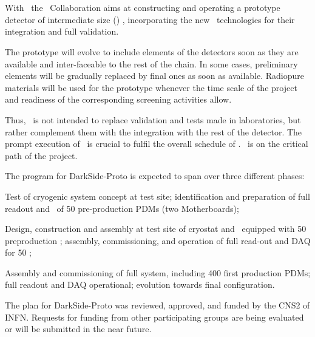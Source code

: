 \section{\DSp}
\label{sec:proto}



With \DSps\ the \DS\ Collaboration aims at constructing and operating a prototype detector of intermediate size (\DSpApproximateMass) , incorporating the new \DSks\ technologies for their integration and full validation.  


The prototype will evolve to include elements of the detectors soon as they are available and inter-faceable to the rest of the chain.  In some cases, preliminary elements will be gradually replaced by final ones as soon as available.  Radiopure materials will be used for the prototype whenever the time scale of the project and readiness of the corresponding screening activities allow.

Thus, \DSps\  is not intended to replace validation and tests made in laboratories, but rather complement them with the integration with the rest of the detector.  The prompt execution of \DSps\ is crucial to fulfil the overall schedule of \DSks.  \DSps\ is on the critical path of the project.

The program for DarkSide-Proto is expected to span over three different phases:

\begin{compactenum}
\item Test of cryogenic system concept at test site; identification and preparation of full readout and \DAQ\ of 50 pre-production PDMs (two Motherboards); 
\item Design, construction and assembly at test site of cryostat and \LArTPC\ equipped with 50 preproduction \DSkPdms; assembly, commissioning, and operation of full read-out and DAQ for 50 \DSkPdms;
\item Assembly and commissioning of full system, including 400 first production PDMs; full readout and DAQ operational; evolution towards final configuration. 
\end{compactenum}

The plan for DarkSide-Proto was reviewed, approved, and funded by the CNS2 of INFN. Requests for funding from other participating groups are being evaluated or will be submitted in the near future. 

